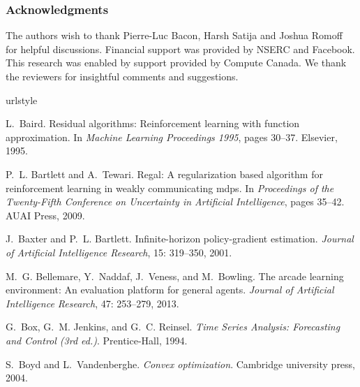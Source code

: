 \documentclass{article}
\begin{document}
\subsubsection*{Acknowledgments}
The authors wish to thank Pierre-Luc Bacon, Harsh Satija and Joshua Romoff  for helpful discussions. Financial support was provided by NSERC and Facebook. This research was enabled by support provided by Compute Canada. We thank the reviewers for insightful comments and suggestions.


\clearpage




\begin{thebibliography}{36}
\providecommand{\natexlab}[1]{#1}
\providecommand{\url}[1]{\texttt{#1}}
\expandafter\ifx\csname urlstyle\endcsname\relax
  \providecommand{\doi}[1]{doi: #1}\else
  \providecommand{\doi}{doi: \begingroup \urlstyle{rm}\Url}\fi

L.~Baird.
\newblock Residual algorithms: Reinforcement learning with function
  approximation.
\newblock In \emph{Machine Learning Proceedings 1995}, pages 30--37. Elsevier,
  1995.

P.~L. Bartlett and A.~Tewari.
\newblock Regal: A regularization based algorithm for reinforcement learning in
  weakly communicating mdps.
\newblock In \emph{Proceedings of the Twenty-Fifth Conference on Uncertainty in
  Artificial Intelligence}, pages 35--42. AUAI Press, 2009.

J.~Baxter and P.~L. Bartlett.
\newblock Infinite-horizon policy-gradient estimation.
\newblock \emph{Journal of Artificial Intelligence Research}, 15:
  319--350, 2001.

M.~G. Bellemare, Y.~Naddaf, J.~Veness, and M.~Bowling.
\newblock The arcade learning environment: An evaluation platform for general
  agents.
\newblock \emph{Journal of Artificial Intelligence Research}, 47:
  253--279, 2013.

G.~Box, G.~M. Jenkins, and G.~C. Reinsel.
\newblock \emph{Time Series Analysis: Forecasting and Control (3rd ed.)}.
\newblock Prentice-Hall, 1994.

S.~Boyd and L.~Vandenberghe.
\newblock \emph{Convex optimization}.
\newblock Cambridge university press, 2004.


\end{thebibliography}
\end{document}

